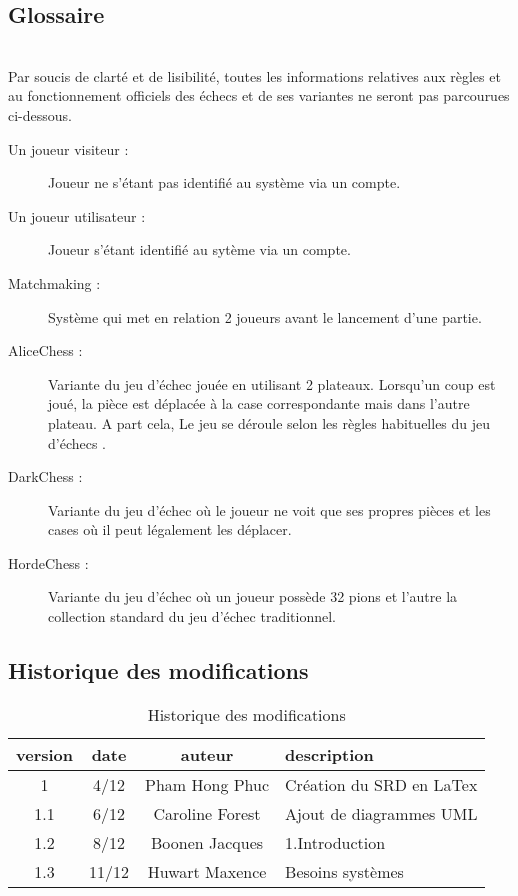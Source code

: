 \documentclass[10pt, a4paper]{article}
\begin{document}
			
			

		\subsection{Glossaire}\\ Par soucis de clarté et de lisibilité, toutes les informations relatives aux règles et au fonctionnement officiels des échecs et de ses variantes ne seront pas parcourues ci-dessous. 
		\begin{description}
		\item[Un joueur visiteur :] Joueur ne s'étant pas identifié au système via un compte.
		\item[Un joueur utilisateur :] Joueur s'étant identifié au sytème via un compte.
		\item[Matchmaking :] Système qui met en relation 2 joueurs avant le lancement d'une partie.
		\item[AliceChess :] Variante du jeu d'échec jouée en utilisant 2 plateaux. Lorsqu'un coup est joué, la pièce est déplacée à la case correspondante mais dans l'autre plateau. A part cela, Le jeu se déroule selon les règles habituelles du jeu d'échecs .
		\item[DarkChess :] Variante du jeu d'échec où le joueur ne voit que ses propres pièces et les cases où il peut légalement les déplacer.
		\item[HordeChess :] Variante du jeu d'échec où un joueur possède 32 pions et l'autre la collection standard du jeu d'échec traditionnel.
		\end{description}

		\subsection{Historique des modifications}
		
		\begin{table}[h!]
			\centering
			\begin{tabular}{|c|c|c|p{50mm}|}
				\hline
				 \textbf{version} & \textbf{date} & \textbf{auteur}  & \textbf{description} \\ \hline
				 1 & 4/12 & Pham Hong Phuc & Création du SRD en LaTex\\ \hline
				 1.1 & 6/12 & Caroline Forest & Ajout de diagrammes UML\\ \hline
				 1.2 & 8/12 & Boonen Jacques & 1.Introduction\\ \hline 
				 1.3 & 11/12 & Huwart Maxence & Besoins systèmes\\ \hline
\end{tabular}
			\caption*{Historique des modifications}
			\end{table}
\end{document}
